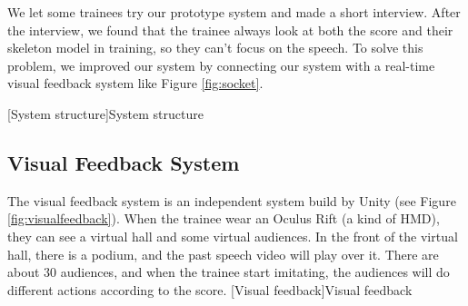 \newpage
\par We let some trainees try our prototype system and made a short interview. After the interview, we found that the trainee always look at both the score and their skeleton model in training, so they can't focus on the speech. To solve this problem, we improved our system by connecting our system with a real-time visual feedback system like Figure \ref{fig:socket}.

[System structure]{System structure}


\newpage
\subsection*{Visual Feedback System \cite{YiHuang2018}}
\par The visual feedback system is an independent system build by Unity (see Figure \ref{fig:visualfeedback}). When the trainee wear an Oculus Rift (a kind of HMD), they can see a virtual hall and some virtual audiences. In the front of the virtual hall, there is a podium, and the past speech video will play over it. There are about 30 audiences, and when the trainee start imitating, the audiences will do different actions according to the score.
[Visual feedback]{Visual feedback}
